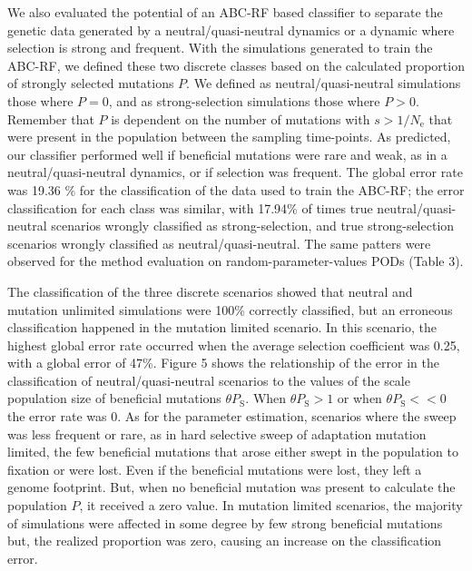 \documentclass[a4paper, 12pt]{article}
\begin{document}
We also evaluated the potential of an ABC-RF based classifier to separate the genetic data generated by a neutral/quasi-neutral dynamics or a dynamic where selection is strong and frequent. With the simulations generated to train the ABC-RF, we defined these two discrete classes based on the calculated proportion of strongly selected mutations $P$. We defined as neutral/quasi-neutral simulations those where $P = 0$, and as strong-selection simulations those where $P>0$. Remember that $P$ is dependent on the number of mutations with $s > 1/N_{\mathrm{e}}$ that were present in the population between the sampling time-points. As predicted, our classifier performed well if beneficial mutations were rare and weak, as in a neutral/quasi-neutral dynamics, or if selection was frequent. The global error rate was 19.36 \% for the classification of the data used to train the ABC-RF; the error classification for each class was similar, with 17.94\% of times true neutral/quasi-neutral scenarios wrongly classified as strong-selection, and true strong-selection scenarios wrongly classified as neutral/quasi-neutral. The same patters were observed for the method evaluation on random-parameter-values PODs (Table 3). 

The classification of the three discrete scenarios showed that neutral and mutation unlimited simulations were 100\% correctly classified, but an erroneous classification happened in the mutation limited scenario. In this scenario, the highest global error rate occurred when the average selection coefficient was 0.25, with a global error of 47\%. Figure 5 shows the relationship of the error in the classification of neutral/quasi-neutral scenarios to the values of the scale population size of beneficial mutations $\theta P_{\mathrm{S}}$. When $\theta P_{\mathrm{S}} > 1$ or when $\theta P_{\mathrm{S}} << 0$ the error rate was 0. As for the parameter estimation, scenarios where the sweep was less frequent or rare, as in hard selective sweep of adaptation mutation limited, the few beneficial mutations that arose either swept in the population to fixation or were lost. Even if the beneficial mutations were lost, they left a genome footprint. But, when no beneficial mutation was present to calculate the population $P$, it received a zero value. In mutation limited scenarios, the majority of simulations were affected in some degree by few strong beneficial mutations but, the realized proportion was zero, causing an increase on the classification error.
\end{document}
